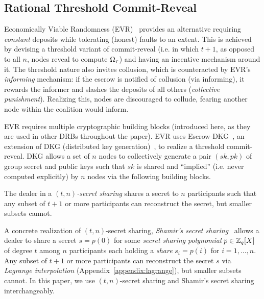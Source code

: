 \subsection{Rational Threshold Commit-Reveal}
Economically Viable Randomness (EVR)~\cite{david2020economically} provides an alternative requiring \textit{constant} deposits while tolerating (honest) faults to an extent. This is achieved by devising a threshold variant of commit-reveal (i.e. in which $t + 1$, as opposed to all $n$, nodes reveal to compute $\Omega_\tau$) and having an incentive mechanism around it. The threshold nature also invites collusion, which is counteracted by EVR's \textit{informing} mechanism: if the escrow is notified of collusion (via informing), it rewards the informer and slashes the deposits of all others (\textit{collective punishment}). Realizing this, nodes are discouraged to collude, fearing another node within the coalition would inform.

EVR requires multiple cryptographic building blocks (introduced here, as they are used in other DRBs throughout the paper).
EVR uses Escrow-DKG~\cite{david2019rational}, an extension of DKG (distributed key generation)~\cite{pedersen1991threshold,gennaro1999secure}, to realize a threshold commit-reveal.
DKG allows a set of $n$ nodes to collectively generate a pair $(sk, pk)$ of group secret and public keys such that $sk$ is shared and ``implied'' (i.e. never computed explicitly) by $n$ nodes via the following building blocks.

\begin{definition}
The dealer in a \textit{$(t, n)$-secret sharing} shares a secret to $n$ participants such that any subset of $t + 1$ or more participants can reconstruct the secret, but smaller subsets cannot.
\end{definition}

\begin{definition}
A concrete realization of $(t, n)$-secret sharing, \textit{Shamir's secret sharing}~\cite{shamir1979share} allows a dealer to share a secret $s = p(0)$ for some \textit{secret sharing polynomial} $p \in \mathbb{Z}_q[X]$ of degree $t$ among $n$ participants each holding a \textit{share} $s_i = p(i)$ for $i = 1, ..., n$.
Any subset of $t + 1$ or more participants can reconstruct the secret $s$ via \textit{Lagrange interpolation} (Appendix~\ref{appendix:lagrange}), but smaller subsets cannot.
In this paper, we use $(t, n)$-secret sharing and Shamir's secret sharing interchangeably.
\end{definition}

